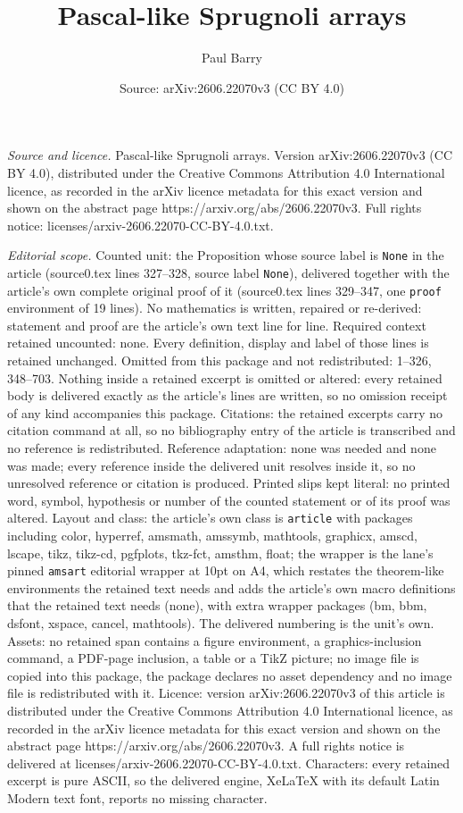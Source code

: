 \documentclass[10pt,a4paper]{amsart}
\title[Pascal-like Sprugnoli arrays]{Pascal-like Sprugnoli arrays}
\author{Paul Barry}
\date{Source: arXiv:2606.22070v3 (CC BY 4.0)}
\begin{document}
\maketitle

\noindent\emph{Source and licence.} Pascal-like Sprugnoli arrays. Version arXiv:2606.22070v3 (CC BY 4.0), distributed under the Creative Commons Attribution 4.0 International licence, as recorded in the arXiv licence metadata for this exact version and shown on the abstract page https://arxiv.org/abs/2606.22070v3. Full rights notice: licenses/arxiv-2606.22070-CC-BY-4.0.txt.\par\smallskip

\noindent\textit{Editorial scope.} Counted unit: the Proposition whose source label is \texttt{None} in the article (source0.tex lines 327--328, source label \texttt{None}), delivered together with the article's own complete original proof of it (source0.tex lines 329--347, one \texttt{proof} environment of 19 lines). No mathematics is written, repaired or re-derived: statement and proof are the article's own text line for line. Required context retained uncounted: none. Every definition, display and label of those lines is retained unchanged. Omitted from this package and not redistributed: 1--326, 348--703. Nothing inside a retained excerpt is omitted or altered: every retained body is delivered exactly as the article's lines are written, so no omission receipt of any kind accompanies this package. Citations: the retained excerpts carry no citation command at all, so no bibliography entry of the article is transcribed and no reference is redistributed. Reference adaptation: none was needed and none was made; every reference inside the delivered unit resolves inside it, so no unresolved reference or citation is produced. Printed slips kept literal: no printed word, symbol, hypothesis or number of the counted statement or of its proof was altered. Layout and class: the article's own class is \texttt{article} with packages including color, hyperref, amsmath, amssymb, mathtools, graphicx, amscd, lscape, tikz, tikz-cd, pgfplots, tkz-fct, amsthm, float; the wrapper is the lane's pinned \texttt{amsart} editorial wrapper at 10pt on A4, which restates the theorem-like environments the retained text needs and adds the article's own macro definitions that the retained text needs (none), with extra wrapper packages (bm, bbm, dsfont, xspace, cancel, mathtools). The delivered numbering is the unit's own. Assets: no retained span contains a figure environment, a graphics-inclusion command, a PDF-page inclusion, a table or a TikZ picture; no image file is copied into this package, the package declares no asset dependency and no image file is redistributed with it. Licence: version arXiv:2606.22070v3 of this article is distributed under the Creative Commons Attribution 4.0 International licence, as recorded in the arXiv licence metadata for this exact version and shown on the abstract page https://arxiv.org/abs/2606.22070v3. A full rights notice is delivered at licenses/arxiv-2606.22070-CC-BY-4.0.txt. Characters: every retained excerpt is pure ASCII, so the delivered engine, XeLaTeX with its default Latin Modern text font, reports no missing character.
\end{document}
